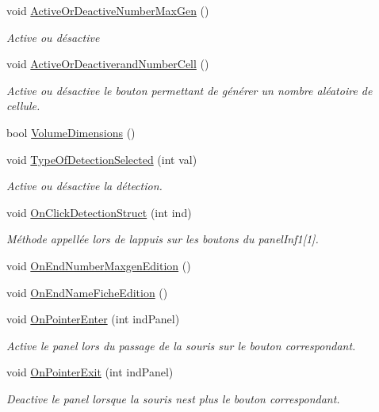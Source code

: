 \begin{DoxyCompactItemize}
void \mbox{\hyperlink{class_parameters_a1db238650db0f62fade69c0da51a0e83}{Active\+Or\+Deactive\+Number\+Max\+Gen}} ()
\begin{DoxyCompactList}\small\item\em Active ou désactive \end{DoxyCompactList}\item 
void \mbox{\hyperlink{class_parameters_af21422abe34305567b0d9ef4982c9ea8}{Active\+Or\+Deactiverand\+Number\+Cell}} ()
\begin{DoxyCompactList}\small\item\em Active ou désactive le bouton permettant de générer un nombre aléatoire de cellule. \end{DoxyCompactList}\item 
bool \mbox{\hyperlink{class_parameters_a92f68fa9992b1066153a6175dd37dc36}{Volume\+Dimensions}} ()
\item 
void \mbox{\hyperlink{class_parameters_aea7e3963fed0681d7a9f756a5deb52d1}{Type\+Of\+Detection\+Selected}} (int val)
\begin{DoxyCompactList}\small\item\em Active ou désactive la détection. \end{DoxyCompactList}\item 
void \mbox{\hyperlink{class_parameters_ad62219d943618c3b970a46239ae443ae}{On\+Click\+Detection\+Struct}} (int ind)
\begin{DoxyCompactList}\small\item\em Méthode appellée lors de l\textquotesingle{}appuis sur les boutons du panel\+Inf1\mbox{[}1\mbox{]}. \end{DoxyCompactList}\item 
void \mbox{\hyperlink{class_parameters_a4167680889821ca1d2f3bc487b0bebae}{On\+End\+Number\+Maxgen\+Edition}} ()
\item 
void \mbox{\hyperlink{class_parameters_ad3db64cd1a228cb925a9afd7f32332a5}{On\+End\+Name\+Fiche\+Edition}} ()
\item 
void \mbox{\hyperlink{class_parameters_aa0a97bc80e6c1cdf8a43513c187f33aa}{On\+Pointer\+Enter}} (int ind\+Panel)
\begin{DoxyCompactList}\small\item\em Active le panel lors du passage de la souris sur le bouton correspondant. \end{DoxyCompactList}\item 
void \mbox{\hyperlink{class_parameters_a711df8be88106725f5e1cf4bf74a5e21}{On\+Pointer\+Exit}} (int ind\+Panel)
\begin{DoxyCompactList}\small\item\em Deactive le panel lorsque la souris n\textquotesingle{}est plus le bouton correspondant. \end{DoxyCompactList}\item 

\end{DoxyCompactItemize}
